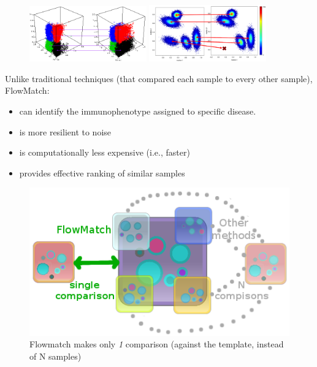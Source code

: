 \documentclass[landscape]{sciposter}
\begin{document}
\begin{multicols}{5}
\begin{figure}[t!h]
\centering
\begin{minipage}[b]{\linewidth}
\includegraphics[width=0.45\textwidth]{images/matching}
\hfill
\includegraphics[width=0.45\textwidth]{images/flow-matching}
\end{minipage}
\end{figure}
\vspace*{+1cm}

Unlike traditional techniques (that compared each sample to every other sample), FlowMatch:
\begin{itemize}
\itemsep0em
\item can identify the immunophenotype assigned to specific disease.
\item is more resilient to noise
\item is computationally less expensive (i.e., faster)
\item provides effective ranking of similar samples
\end{itemize}


\begin{figure} [h]
\centering
\includegraphics[width=\textwidth]{images/tpl-samples.png}
\caption{Flowmatch makes only \emph{1} comparison (against the template, instead of N samples)}
\end{figure}


\end{multicols}
\end{document}
